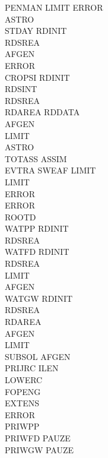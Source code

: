 \documentclass[11pt]{article}
\begin{document}
\begin{tabbing}
\>\> \> \> \> \> \> \> PENMAN\> LIMIT\> ERROR\\
\>\> \> \> \> \> \> \> \> ASTRO\\
\>\> \> \> \> \> STDAY\> \> RDINIT\\
\>\> \> \> \> \> \> \> RDSREA\\
\>\> \> \> \> \> \> \> AFGEN\\
\>\> \> \> \> \> \> \> ERROR\\
\>\> \> \> \> \> CROPSI\> \> RDINIT\\
\>\> \> \> \> \> \> \> RDSINT\\
\>\> \> \> \> \> \> \> RDSREA\\
\>\> \> \> \> \> \> \> RDAREA\> RDDATA\\
\>\> \> \> \> \> \> \> AFGEN\\
\>\> \> \> \> \> \> \> LIMIT\\
\>\> \> \> \> \> \> \> ASTRO\\
\>\> \> \> \> \> \> \> TOTASS\> ASSIM\\
\>\> \> \> \> \> \> \> EVTRA\> SWEAF\> LIMIT\\
\>\> \> \> \> \> \> \> \> LIMIT\\
\>\> \> \> \> \> \> \> ERROR\\
\>\> \> \> \> \> ERROR\\
\>\> \> \> \> \> ROOTD\\
\>\> \> \> \> \> WATPP\> \> RDINIT\\
\>\> \> \> \> \> RDSREA\\
\>\> \> \> \> \> WATFD\> \> RDINIT\\
\>\> \> \> \> \> \> \> RDSREA\\
\>\> \> \> \> \> \> \> LIMIT\\
\>\> \> \> \> \> \> \> AFGEN\\
\>\> \> \> \> \> WATGW\> \> RDINIT\\
\>\> \> \> \> \> \> \> RDSREA\\
\>\> \> \> \> \> \> \> RDAREA\\
\>\> \> \> \> \> \> \> AFGEN\\
\>\> \> \> \> \> \> \> LIMIT\\
\>\> \> \> \> \> \> \> SUBSOL\> AFGEN\\
\>\> \> \> \> \> PRIJRC\> \> ILEN\\
\>\> \> \> \> \> \> \> LOWERC\\
\>\> \> \> \> \> \> \> FOPENG\\
\>\> \> \> \> \> \> \> EXTENS\\
\>\> \> \> \> \> \> \> ERROR\\
\>\> \> \> \> \> PRIWPP\\
\>\> \> \> \> \> PRIWFD\> \> PAUZE\\
\>\> \> \> \> \> PRIWGW\> \> PAUZE
\end{tabbing}
\end{document}
